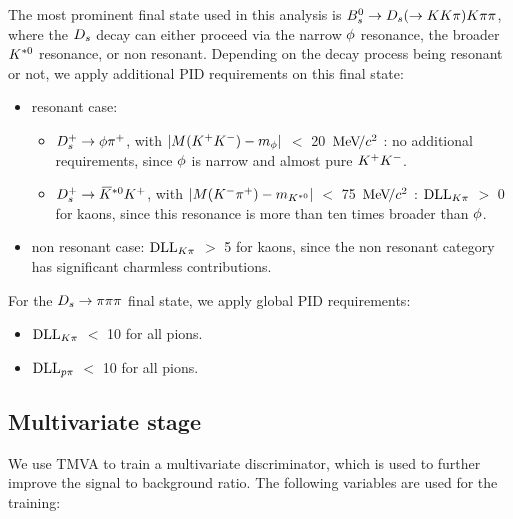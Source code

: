 The most prominent final state used in this analysis is ${{B}^0_{s}}\rightarrow{\ensuremath{{D}_{s}}}(\rightarrow{\ensuremath{K}}{\ensuremath{K}}{\ensuremath{\pi}}){K}{\pi}{\pi}$, 
where the ${{D}_{s}}$ decay can either proceed via the narrow $\phi$ resonance, the broader ${{K}^{*0}}$ resonance, or non resonant.
Depending on the decay process being resonant or not, we apply additional PID requirements on this final state:

\begin{itemize}

\item resonant case: 
\begin{itemize}
\item ${{D}^+_{s}}\rightarrow\phi{\ensuremath{{\pi}^+}}$, with $|M({{K}^+}{{K}^-}) - m_{\phi}|$ $<$ 20 ${\mathrm{\,Me\kern -0.1em V\!/}c^2}$ : no additional requirements, since $\phi$ is narrow and almost pure ${{K}^+}{{K}^-}$. 
\item ${{D}^+_{s}}\rightarrow{\ensuremath{{\kern 0.2em\overline{\kern -0.2em K}{}}{}^{*0}}}{\ensuremath{{K}^+}}$, with  $|M({{K}^-}{{\pi}^+}) -m_{{{K}^{*0}}}|$ $<$ 75 ${\mathrm{\,Me\kern -0.1em V\!/}c^2}$ :  $\mathrm{DLL}_{{K}{\pi}}$ $>$ 0 for kaons, since this resonance is more than ten times broader than $\phi$. 
\end{itemize}

\item non resonant case: $\mathrm{DLL}_{{K}{\pi}}$ $>$ 5 for kaons, since the non resonant category has significant charmless contributions.

\end{itemize}


For the ${{D}_{s}}\rightarrow{\ensuremath{\pi}}{\ensuremath{\pi}}{\ensuremath{\pi}}$ final state, we apply global PID requirements:

\begin{itemize}

\item $\mathrm{DLL}_{{K}{\pi}}$ $<$ 10 for all pions.

\item $\mathrm{DLL}_{{p}{\pi}}$ $<$ 10 for all pions.

\end{itemize}
 


\subsection{Multivariate stage}

We use TMVA \cite{Hocker:2007ht} to train a multivariate discriminator, which is used to further improve the signal to background ratio. 
The following variables are used for the training:

